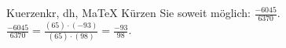 \begin{MAufgabe}{Kuerzen}{kr, dh, MaTeX}
K\"urzen Sie soweit m\"oglich: $\frac{-6045}{6370}$.\\ 
\ifLsg\MLoesung
\quad $\frac{-6045}{6370}=\frac{(65)\cdot(-93)}{(65)\cdot(98)}=\frac{-93}{98}$.\else\relax\fi
 \end{MAufgabe}